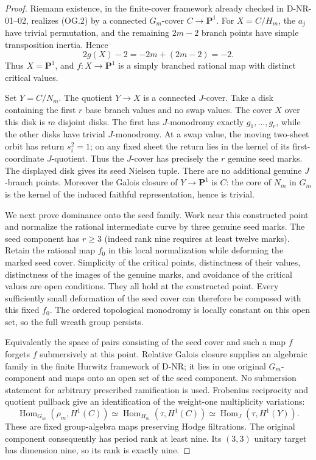 \begin{proof}
Riemann existence, in the finite-cover framework already checked
in D-NR-01--02, realizes (OG.2) by a connected $G_m$-cover
$C\longrightarrow\mathbf P^1$.  For $X=C/H_m$, the $a_j$
have trivial permutation, and the remaining $2m-2$ branch points
have simple transposition inertia.  Hence
\[
 2g(X)-2=-2m+(2m-2)=-2.
 \tag{OG.6}
\]
Thus $X=\mathbf P^1$, and $f:X\to\mathbf P^1$ is a simply
branched rational map with distinct critical values.

Set $Y=C/N_m$.  The quotient $Y\to X$ is a connected $J$-cover.
Take a disk containing the first $r$ base branch values and no
swap values.  The cover $X$ over this disk is $m$ disjoint disks.
The first has $J$-monodromy exactly $g_1,\ldots,g_r$, while
the other disks have trivial $J$-monodromy.  At a swap value,
the moving two-sheet orbit has return $s_i^2=1$; on any fixed
sheet the return lies in the kernel of its first-coordinate
$J$-quotient.  Thus the $J$-cover has precisely the $r$ genuine
seed marks.  The displayed disk gives its seed Nielsen tuple.
There are no additional genuine $J$-branch points.
Moreover the Galois closure of $Y\to\mathbf P^1$ is $C$:
the core of $N_m$ in $G_m$ is the kernel of the induced faithful
representation, hence is trivial.

We next prove dominance onto the seed family.  Work near this
constructed point and normalize the rational intermediate curve
by three genuine seed marks.  The seed component has $r\ge3$
(indeed rank nine requires at least twelve marks).
Retain the rational map $f_0$ in this local normalization while
deforming the marked seed cover.  Simplicity of the critical
points, distinctness of their values, distinctness of the images
of the genuine marks, and avoidance of the critical values are
open conditions.  They all hold at the constructed point.
Every sufficiently small deformation of the seed cover can
therefore be composed with this fixed $f_0$.  The ordered
topological monodromy is locally constant on this open set,
so the full wreath group persists.

Equivalently the space of pairs consisting of the seed cover
and such a map $f$ forgets $f$ submersively at this point.
Relative Galois closure supplies an algebraic family in the
finite Hurwitz framework of D-NR; it lies in one original
$G_m$-component and maps onto an open set of the seed component.
No submersion statement for arbitrary prescribed ramification
is used.  Frobenius reciprocity and quotient pullback give an
identification of the weight-one multiplicity variations:
\[
 \operatorname{Hom}_{G_m}(\rho_m,H^1(C))
 \simeq
 \operatorname{Hom}_{H_m}(\tau,H^1(C))
 \simeq
 \operatorname{Hom}_J(\tau,H^1(Y)).
 \tag{OG.7}
\]
These are fixed group-algebra maps preserving Hodge filtrations.
The original component consequently has period rank at least
nine.  Its $(3,3)$ unitary target has dimension nine, so its
rank is exactly nine.


\end{proof}
